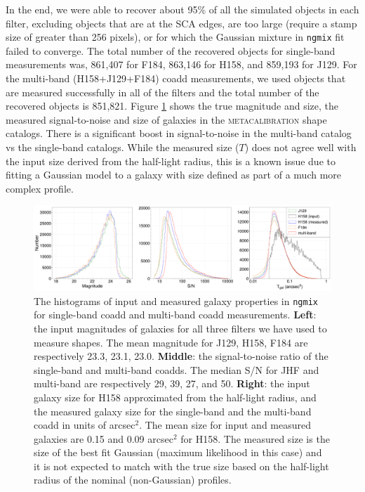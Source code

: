\documentclass[fleqn,usenatbib]{mnras}
\begin{document}
In the end, we were able to recover about 95\% of all the simulated objects in each filter, excluding objects that are at the SCA edges, are too large (require a stamp size of greater than 256 pixels), or for which the Gaussian mixture in \texttt{ngmix} fit failed to converge. The total number of the recovered objects for single-band measurements was, 861,407 for F184, 863,146 for H158, and 859,193 for J129. For the multi-band (H158+J129+F184) coadd measurements, we used objects that are measured successfully in all of the filters and the total number of the recovered objects is 851,821.
Figure \ref{fig:ngmix_measured_properties} shows the true magnitude and size, the measured signal-to-noise and size of galaxies in the \textsc{metacalibration} shape catalogs. There is a significant boost in signal-to-noise in the multi-band catalog vs the single-band catalogs. While the measured size ($T$) does not agree well with the input size derived from the half-light radius, this is a known issue due to fitting a Gaussian model to a galaxy with size defined as part of a much more complex profile.


\begin{figure}
    \centering
	\includegraphics[width=\textwidth]{true_ngmix_measured_properties_pplt.pdf}
    \caption{The histograms of input and measured galaxy properties in \texttt{ngmix} for single-band coadd and multi-band coadd measurements. \textbf{Left}: the input magnitudes of galaxies for all three filters we have used to measure shapes. The mean magnitude for J129, H158, F184 are respectively 23.3, 23.1, 23.0. \textbf{Middle}: the signal-to-noise ratio of the single-band and multi-band coadds. The median S/N for JHF and multi-band are respectively 29, 39, 27, and 50. \textbf{Right}: the input galaxy size for H158 approximated from the half-light radius, and the measured galaxy size for the single-band and the multi-band coadd in units of arcsec$^2$. The mean size for input and measured galaxies are 0.15 and 0.09 arcsec$^2$ for H158. The measured size is the size of the best fit Gaussian (maximum likelihood in this case) and it is not expected to match with the true size based on the half-light radius of the nominal (non-Gaussian) profiles.}
    \label{fig:ngmix_measured_properties}
\end{figure}
\end{document}
